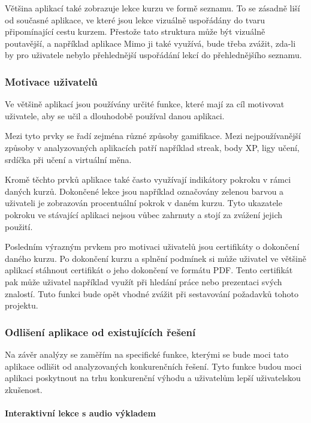 Většina aplikací také zobrazuje lekce kurzu ve formě seznamu. To se zásadně liší od současné aplikace, ve které jsou lekce vizuálně uspořádány do tvaru připomínající cestu kurzem. Přestože tato struktura může být vizuálně poutavější, a například aplikace Mimo ji také využívá, bude třeba zvážit, zda-li by pro uživatele nebylo přehlednější uspořádání lekcí do přehlednějšího seznamu.

\subsubsection{Motivace uživatelů}

Ve většině aplikací jsou používány určité funkce, které mají za cíl motivovat uživatele, aby se učil a dlouhodobě používal danou aplikaci.

Mezi tyto prvky se řadí zejména různé způsoby gamifikace. Mezi nejpoužívanější způsoby v analyzovaných aplikacích patří například streak, body XP, ligy učení, srdíčka při učení a virtuální měna. 

Kromě těchto prvků aplikace také často využívají indikátory pokroku v rámci daných kurzů. Dokončené lekce jsou například označovány zelenou barvou a uživateli je zobrazován procentuální pokrok v daném kurzu. Tyto ukazatele pokroku ve stávající aplikaci nejsou vůbec zahrnuty a stojí za zvážení jejich použití.

Posledním výrazným prvkem pro motivaci uživatelů jsou certifikáty o dokončení daného kurzu. Po dokončení kurzu a splnění podmínek si může uživatel ve většině aplikací stáhnout certifikát o jeho dokončení ve formátu PDF. Tento certifikát pak může uživatel například využít při hledání práce nebo prezentaci svých znalostí. Tuto funkci bude opět vhodné zvážit při sestavování požadavků tohoto projektu.  

\subsubsection{Odlišení aplikace od existujících řešení}

Na závěr analýzy se zaměřím na specifické funkce, kterými se bude moci tato aplikace odlišit od analyzovaných konkurenčních řešení. Tyto funkce budou moci aplikaci poskytnout na trhu konkurenční výhodu a uživatelům lepší uživatelskou zkušenost.

\paragraph{Interaktivní lekce s audio výkladem}

